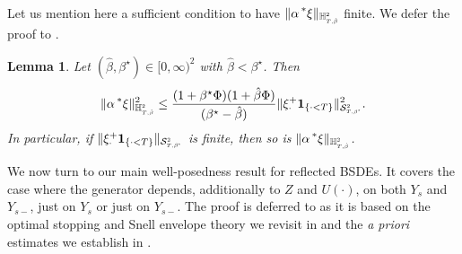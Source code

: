 \documentclass[10pt]{article} %
\newtheorem{lemma}[theorem]{Lemma}
\newcommand\cS{\mathcal S}
\newcommand{\smalltext}[1]{\text{\fontsize{4}{4}\selectfont$#1$}}
\def \H{\mathbb{H}}
\newcommand{\brs}[1]{\prescript{\ast}{}{#1}}
\newcommand{\1}{\mathbf{1}}
\begin{document}
Let us mention here a sufficient condition to have $\|\alpha \brs{\xi}\|_{\H^\smalltext{2}_{\smalltext{T}\smalltext{,}\smalltext{\hat\beta}}}$ finite. We defer the proof to .

\begin{lemma}\label{lem::integrability_xi}
	Let $(\hat\beta,\beta^\star) \in [0,\infty)^2$ with $\hat\beta < \beta^\star$. Then
	\begin{equation*}
		\|\alpha \brs{\xi}\|_{\H^\smalltext{2}_{\smalltext{T}\smalltext{,}\smalltext{\hat\beta}}}^2 
		\leq \frac{(1+\beta^\star \Phi)(1+\hat\beta \Phi)}{(\beta^\star-\hat\beta)}\|\xi^+_\cdot \mathbf{1}_{\{\cdot < T\}}\|^2_{\cS^\smalltext{2}_{\smalltext{T}\smalltext{,}\smalltext{\beta^\star}}}.
	\end{equation*}
	In particular, if $\|\xi^+_\cdot \mathbf{1}_{\{\cdot < T\}}\|_{\cS^\smalltext{2}_{\smalltext{T}\smalltext{,}\smalltext{\beta^\star}}}$ is finite, then so is $\|\alpha \brs{\xi}\|_{\H^\smalltext{2}_{\smalltext{T}\smalltext{,}\smalltext{\hat\beta}}}$.
\end{lemma}

We now turn to our main well-posedness result for reflected BSDEs. It covers the case where the generator depends, additionally to $Z$ and $U(\cdot)$, on both $Y_s$ and $Y_{s-}$, just on $Y_s$ or just on $Y_{s-}$. The proof is deferred to  as it is based on the optimal stopping and Snell envelope theory we revisit in  and the \emph{a priori} estimates we establish in .
\end{document}
